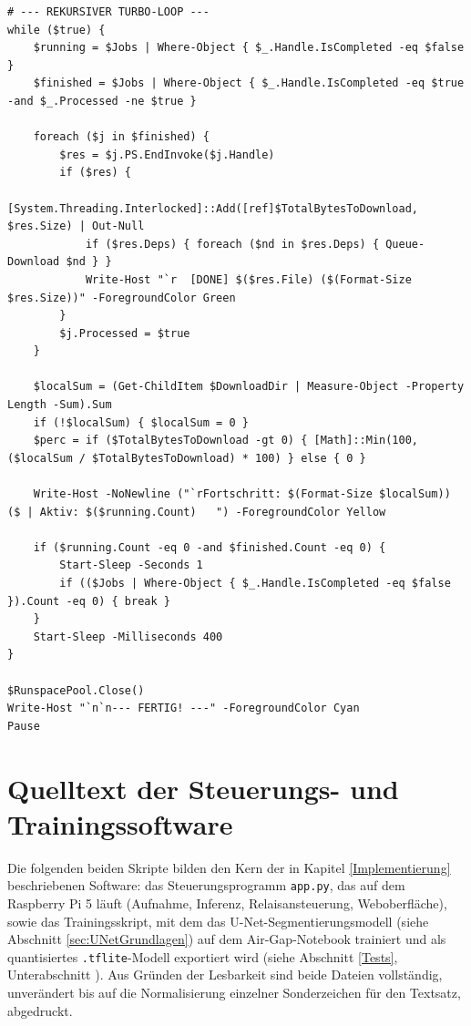 \begin{lstlisting}[caption=Vollständiges Powershell-Skript zum Download von Wheel-Dateien, label=lst:powershell]
# --- REKURSIVER TURBO-LOOP ---
while ($true) {
    $running = $Jobs | Where-Object { $_.Handle.IsCompleted -eq $false }
    $finished = $Jobs | Where-Object { $_.Handle.IsCompleted -eq $true -and $_.Processed -ne $true }

    foreach ($j in $finished) {
        $res = $j.PS.EndInvoke($j.Handle)
        if ($res) {
            [System.Threading.Interlocked]::Add([ref]$TotalBytesToDownload, $res.Size) | Out-Null
            if ($res.Deps) { foreach ($nd in $res.Deps) { Queue-Download $nd } }
            Write-Host "`r  [DONE] $($res.File) ($(Format-Size $res.Size))" -ForegroundColor Green
        }
        $j.Processed = $true
    }

    $localSum = (Get-ChildItem $DownloadDir | Measure-Object -Property Length -Sum).Sum
    if (!$localSum) { $localSum = 0 }
    $perc = if ($TotalBytesToDownload -gt 0) { [Math]::Min(100, ($localSum / $TotalBytesToDownload) * 100) } else { 0 }

    Write-Host -NoNewline ("`rFortschritt: $(Format-Size $localSum)) ($ | Aktiv: $($running.Count)   ") -ForegroundColor Yellow

    if ($running.Count -eq 0 -and $finished.Count -eq 0) {
        Start-Sleep -Seconds 1
        if (($Jobs | Where-Object { $_.Handle.IsCompleted -eq $false }).Count -eq 0) { break }
    }
    Start-Sleep -Milliseconds 400
}

$RunspacePool.Close()
Write-Host "`n`n--- FERTIG! ---" -ForegroundColor Cyan
Pause
\end{lstlisting}

\section{Quelltext der Steuerungs- und Trainingssoftware}
\label{sec:AnhangCode}

Die folgenden beiden Skripte bilden den Kern der in Kapitel \ref{Implementierung} beschriebenen Software: das Steuerungsprogramm \texttt{app.py}, das auf dem Raspberry Pi 5 läuft (Aufnahme, Inferenz, Relaisansteuerung, Weboberfläche), sowie das Trainingsskript, mit dem das U-Net-Segmentierungsmodell (siehe Abschnitt \ref{sec:UNetGrundlagen}) auf dem Air-Gap-Notebook trainiert und als quantisiertes \texttt{.tflite}-Modell exportiert wird (siehe Abschnitt \ref{Tests}, Unterabschnitt ). Aus Gründen der Lesbarkeit sind beide Dateien vollständig, unverändert bis auf die Normalisierung einzelner Sonderzeichen für den Textsatz, abgedruckt.

